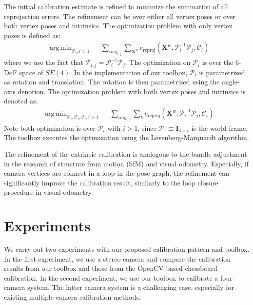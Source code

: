 \documentclass{report}
\DeclareMathOperator*{\argmin}{arg\,min}
\begin{document}
The initial calibration estimate is refined to minimize the summation of all reprojection errors. The refinement can be over either all vertex poses or over both vertex poses and intrinsics. The optimization problem with only vertex poses is defined as: 
\begin{equation}
\begin{aligned}
& \argmin_{\mathcal{P}_i, i > 1} & & \sum_{img_{i, j}} \sum_{\mathbf{X}^w} e_{\textrm{reproj}}(\mathbf{X}^w, \mathcal{P}_i^{-1} \mathcal{P}_j, \mathcal{C}_i) 
\end{aligned}
\end{equation}
where we use the fact that $\mathcal{P}_{i, j} = \mathcal{P}_i^{-1} \mathcal{P}_j$. The optimization on $\mathcal{P}_i$ is over the 6-DoF space of $SE(4)$. In the implementation of our toolbox, $\mathcal{P}_i$ is parametrized as rotation and translation. The rotation is then parametrized using the angle-axis denotion. 
The optimization problem with both vertex poses and intrinsics is denoted as: 
\begin{equation}
\begin{aligned}
& \argmin_{\mathcal{P}_i, \mathcal{C}_1, \mathcal{C}_i, i > 1} & & \sum_{img_{i, j}} \sum_{k} e_{\textrm{reproj}}(\mathbf{X}^w, \mathcal{P}_i^{-1} \mathcal{P}_j, \mathcal{C}_i)
\end{aligned}
\end{equation}
Note both optimization is over $\mathcal{P}_i$ with $i > 1$, since $\mathcal{P}_1 \equiv \mathbf{I}_{4 \times 4}$ is the world frame. The toolbox executes the optimization using the Levenberg-Marquardt algorithm. 

The refinement of the extrinsic calibration is analogous to the bundle adjustment in the research of structure from motion (SfM) and visual odometry. Especially, if camera vertices are connect in a loop in the pose graph, the refinement can significantly improve the calibration result, similarly to the loop closure procedure in visual odometry. 


\chapter{Experiments}
We carry out two experiments with our proposed calibration pattern and toolbox. In the first experiment, we use a stereo camera and compare the calibration results from our toolbox and those from the OpenCV-based chessboard calibration. In the second experiment, we use our toolbox to calibrate a four-camera system. The latter camera system is a challenging case, especially for existing multiple-camera calibration methods. 
\end{document}
